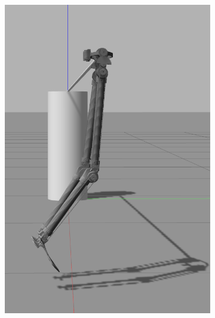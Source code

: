 \begin{figure}[ht!]
\begin{subfigure}[b]{0.16\textwidth}
        \includegraphics[width=\textwidth]{figures/gazebo_jumping_4}
    \end{subfigure}
    \begin{subfigure}[b]{0.16\textwidth}

\end{subfigure}
\end{figure}
